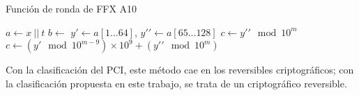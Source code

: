 \begin{algorithm}
  \caption{\label{ffx_ronda} Función de ronda de FFX A10}
  \begin{algorithmic}[1]
      \State $ a \gets x \ || \ t $
      \State $ b \gets $ 
      \State $ y\prime \gets a[1 ... 64] $,
        $ y\prime\prime \gets a[65 ... 128] $
        \State $ c \gets y\prime\prime \mod 10^m $
      \Else
        \State $ c \gets (y\prime \mod 10^{m - 9})
          \times 10^9 + (y\prime\prime \mod 10^m) $
      \EndIf
      \State {}
    \EndFunction
  \end{algorithmic}
\end{algorithm}


Con la clasificación del PCI, este método cae en los reversibles
criptográficos; con la clasificación propuesta en este trabajo, se trata de un
criptográfico reversible.

